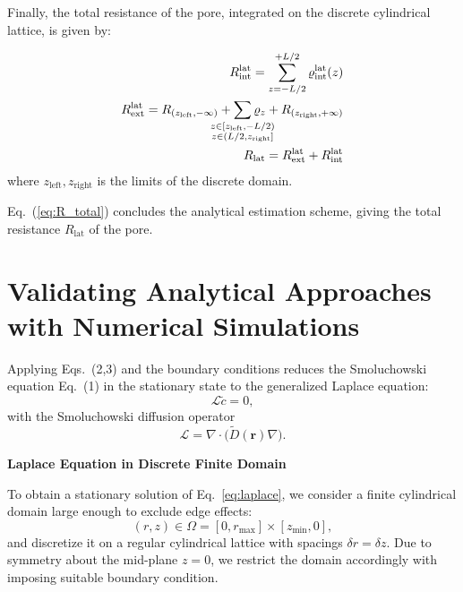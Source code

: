 \documentclass[10pt, a4paper, twocolumn]{article}
\begin{document}
Finally, the total resistance of the pore, integrated on the discrete cylindrical lattice, is given by:

\begin{eqnarray}
    R_{\text{int}}^{\text{lat}} = \sum_{z=-L/2}^{+L/2} \varrho_{\text{int}}^{\text{lat}}(z)
    \\
    R_{\text{ext}}^{\text{lat}} = R_{(z_{\text{left}}, -\infty)} + \sum\limits_{\mathclap{\substack{z \in [z_{\text{left}},-L/2)\\z \in (L/2, z_\text{right}]}}} \varrho_{z} + R_{(z_{\text{right}}, +\infty)}
    \\
    \label{eq:R_total}
    R_{\text{lat}} = R_{\text{ext}}^{\text{lat}} + R_{\text{int}}^{\text{lat}}
\end{eqnarray}
where $z_{\text{left}}, z_{\text{right}}$ is the limits of the discrete domain.

Eq.~(\ref{eq:R_total}) concludes the analytical estimation scheme, giving the total resistance $R_{\text{lat}}$ of the pore.


\section{Validating Analytical Approaches with Numerical Simulations}


Applying Eqs.~(2,3) and the boundary conditions reduces the Smoluchowski equation Eq.~(1) in the stationary state to the generalized Laplace equation:
\begin{equation}
  \mathcal L\tilde c=0,
  \label{eq:laplace}
\end{equation}
with the Smoluchowski diffusion operator
\begin{equation*}
  \mathcal L=\nabla\!\cdot\!\bigl(\tilde D(\bm r)\nabla\bigr).
\end{equation*}

\textbf{Laplace Equation in Discrete Finite Domain}

To obtain a stationary solution of Eq.~\eqref{eq:laplace}, we consider a finite cylindrical domain large enough to exclude edge effects:
\begin{equation*}
  (r,z) \in \Omega = [0,r_{\max}]\times[z_{\min},0],
\end{equation*}
and discretize it on a regular cylindrical lattice with spacings $\delta r=\delta z$. 
Due to symmetry about the mid-plane $z = 0$, we restrict the domain accordingly with imposing suitable boundary condition.
\end{document}
